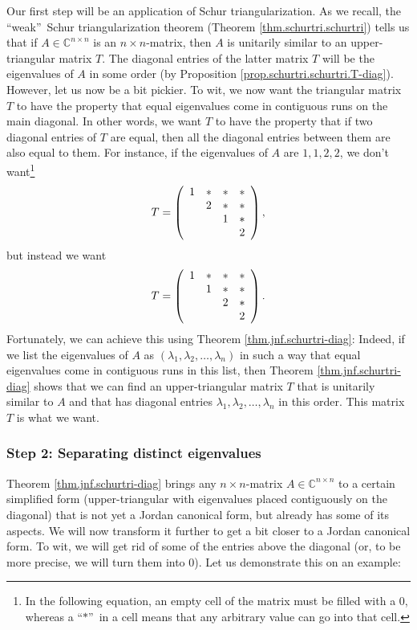 \documentclass[numbers=enddot,12pt,final,onecolumn,notitlepage]{scrartcl}%
\numberwithin{exer}{subsection}
\theoremstyle{definition}
\begin{document}
Our first step will be an application of Schur triangularization. As we
recall, the \textquotedblleft weak\textquotedblright\ Schur triangularization
theorem (Theorem \ref{thm.schurtri.schurtri}) tells us that if $A\in
\mathbb{C}^{n\times n}$ is an $n\times n$-matrix, then $A$ is unitarily
similar to an upper-triangular matrix $T$. The diagonal entries of the latter
matrix $T$ will be the eigenvalues of $A$ in some order (by Proposition
\ref{prop.schurtri.schurtri.T-diag}). However, let us now be a bit pickier. To
wit, we now want the triangular matrix $T$ to have the property that equal
eigenvalues come in contiguous runs on the main diagonal. In other words, we
want $T$ to have the property that if two diagonal entries of $T$ are equal,
then all the diagonal entries between them are also equal to them. For
instance, if the eigenvalues of $A$ are $1,1,2,2$, we don't want\footnote{In
the following equation, an empty cell of the matrix must be filled with a $0$,
whereas a \textquotedblleft$\ast$\textquotedblright\ in a cell means that any
arbitrary value can go into that cell.}%
\[
T=\left(
\begin{array}
[c]{cccc}%
1 & \ast & \ast & \ast\\
& 2 & \ast & \ast\\
&  & 1 & \ast\\
&  &  & 2
\end{array}
\right)  ,
\]
but instead we want%
\[
T=\left(
\begin{array}
[c]{cccc}%
1 & \ast & \ast & \ast\\
& 1 & \ast & \ast\\
&  & 2 & \ast\\
&  &  & 2
\end{array}
\right)  .
\]
Fortunately, we can achieve this using Theorem \ref{thm.jnf.schurtri-diag}:
Indeed, if we list the eigenvalues of $A$ as $\left(  \lambda_{1},\lambda
_{2},\ldots,\lambda_{n}\right)  $ in such a way that equal eigenvalues come in
contiguous runs in this list, then Theorem \ref{thm.jnf.schurtri-diag} shows
that we can find an upper-triangular matrix $T$ that is unitarily similar to
$A$ and that has diagonal entries $\lambda_{1},\lambda_{2},\ldots,\lambda_{n}$
in this order. This matrix $T$ is what we want.

\subsubsection{Step 2: Separating distinct eigenvalues}

Theorem \ref{thm.jnf.schurtri-diag} brings any $n\times n$-matrix
$A\in\mathbb{C}^{n\times n}$ to a certain simplified form (upper-triangular
with eigenvalues placed contiguously on the diagonal) that is not yet a Jordan
canonical form, but already has some of its aspects. We will now transform it
further to get a bit closer to a Jordan canonical form. To wit, we will get
rid of some of the entries above the diagonal (or, to be more precise, we will
turn them into $0$). Let us demonstrate this on an example:
\end{document}
